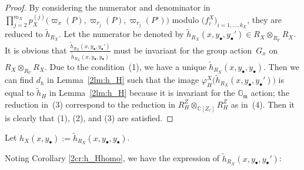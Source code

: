 \documentclass[pdftex]{sigma}
\def\CC{{\mathbb C}}
\def\GG{{\mathbb G}}
\def\PP{{\mathbb P}}
\def\fm{{\mathfrak m}}
\def\th{{\widetilde h}}
\numberwithin{equation}{section}
\begin{document}
\begin{proof}By considering the numerator and denominator in $\prod_{j=2}^{m_X}p_X^{(j)}\bigr(\varpi_x(P), \varpi_{r_j}(P),\varpi_{r_j}(P')\bigr)$ modulo $\big(f_i^X\big)_{i=1, \dots, k_X}$, they are reduced to $\th_{R_X}$.
Let the numerator be denoted by $\th_{R_X}(x, y_{\bullet}, y_{\bullet}')\allowbreak \in R_X\otimes_{R_\PP}R_X$.
It is obvious that $\frac{\th_{R_X}(x, y_{\bullet}, y_{\bullet}')}{\th_{R_X}(x, y_{\bullet}, y_{\bullet})}$ must be invariant for the group action~$G_x$ on $R_X\otimes_{R_\PP}R_X$.
Due to the condition~(1), we have a unique ${\th_{R_X}(x, y_{\bullet}, y_{\bullet})}$.
Then we can find $d_h$ in Lemma~\ref{2lm:h_H} such that the image $\varphi^X_H\big(\th_{R_X}(x, y_{\bullet}, y_{\bullet}')\big)$ is equal to $\th_{H}$ in Lemma~\ref{2lm:h_H} because it is invariant for the $\GG_\fm$ action; the reduction in~(3) correspond to the reduction in $R_H^Z\otimes_{\CC[Z_r]}R_H^Z$ as in~(4).
Then it is clearly that (1), (2), and (3) are satisfied.
\end{proof}

\begin{Definition}\label{2df:h_X00}
Let $h_{X}(x, y_{\bullet}):=\th_{R_X}(x, y_{\bullet}, y_{\bullet})$.
\end{Definition}

Noting Corollary \ref{2cr:h_Hhomo}, we have the expression of $\th_{R_X}(x, y_{\bullet}, y_{\bullet}')$:
\end{document}
